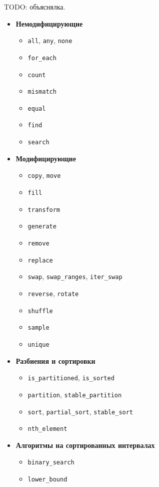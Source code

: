 \documentclass[a4paper,12pt,oneside]{article}
\begin{document}
TODO: объяснялка.

\begin{itemize}
\item \textbf{Немодифицирующие}
\begin{itemize}
\item \lstinline!all!, \lstinline!any!, \lstinline!none!
\item \lstinline!for_each!
\item \lstinline!count!
\item \lstinline!mismatch!
\item \lstinline!equal!
\item \lstinline!find!
\item \lstinline!search!
\end{itemize}
\item \textbf{Модифицирующие}
\begin{itemize}
\item \lstinline!copy!, \lstinline!move!
\item \lstinline!fill!
\item \lstinline!transform!
\item \lstinline!generate!
\item \lstinline!remove!
\item \lstinline!replace!
\item \lstinline!swap!, \lstinline!swap_ranges!, \lstinline!iter_swap!
\item \lstinline!reverse!, \lstinline!rotate!
\item \lstinline!shuffle!
\item \lstinline!sample!
\item \lstinline!unique!
\end{itemize}
\item \textbf{Разбиения и сортировки}
\begin{itemize}
\item \lstinline!is_partitioned!, \lstinline!is_sorted!
\item \lstinline!partition!, \lstinline!stable_partition!
\item \lstinline!sort!, \lstinline!partial_sort!, \lstinline!stable_sort!
\item \lstinline!nth_element!
\end{itemize}
\item \textbf{Алгоритмы на сортированных интервалах}
\begin{itemize}
\item \lstinline!binary_search! 
\item \lstinline!lower_bound!

\end{itemize}
\end{itemize}
\end{document}
